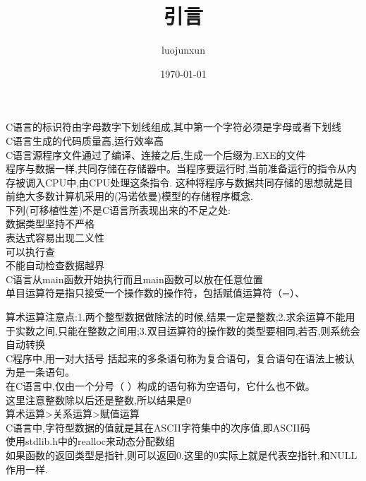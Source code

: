 \documentclass[12pt, a4paper, oneside]{ctexart}
\title{\huge\textbf{引言}}
\author{luojunxun}
\date{\today}
\begin{document}
\maketitle

C语言的标识符由字母数字下划线组成,其中第一个字符必须是字母或者下划线\\

C语言生成的代码质量高,运行效率高\\

C语言源程序文件通过了编译、连接之后,生成一个后缀为.EXE的文件\\

程序与数据一样,共同存储在存储器中。当程序要运行时,当前准备运行的指令从内存被调入CPU中,由CPU处理这条指令.
这种将程序与数据共同存储的思想就是目前绝大多数计算机采用的(冯诺依曼)模型的存储程序概念.\\

下列(可移植性差)不是C语言所表现出来的不足之处:\\
数据类型坚持不严格\\表达式容易出现二义性\\可以执行查\\不能自动检查数据越界\\

C语言从main函数开始执行而且main函数可以放在任意位置\\

单目运算符是指只接受一个操作数的操作符，包括赋值运算符（=）、

算术运算注意点:1.两个整型数据做除法的时候,结果一定是整数;2.求余运算不能用于实数之间,只能在整数之间用;3.双目运算符的操作数的类型要相同,若否,则系统会自动转换\\

C程序中,用一对大括号 括起来的多条语句称为复合语句，复合语句在语法上被认为是一条语句。\\

在C语言中,仅由一个分号（ ）构成的语句称为空语句，它什么也不做。\\


这里注意整数除以后还是整数,所以结果是0\\

算术运算>关系运算>赋值运算\\

C语言中,字符型数据的值就是其在ASCII字符集中的次序值,即ASCII码\\

使用stdlib.h中的realloc来动态分配数组\\

如果函数的返回类型是指针,则可以返回0.这里的0实际上就是代表空指针,和NULL作用一样.\\
\end{document}
